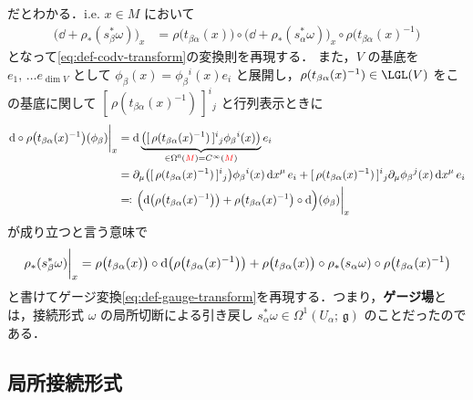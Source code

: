 \documentclass[TQFT_main]{subfiles}
\begin{document}
だとわかる．i.e. $x \in M$ において
\begin{align}
    \bigl(\dd + \rho_* (s^*_\beta \omega)\bigr)_x &= \rho \bigl( t_{\beta\alpha}(x) \bigr) \circ \bigl( \dd + \rho_* (s^*_\alpha \omega) \bigr)_x \circ \rho\bigl(t_{\beta\alpha}(x)^{-1}\bigr)
\end{align}
となって\eqref{eq:def-codv-transform}の変換則を再現する．
また，$V$ の基底を $e_1,\, \dots e_{\dim V}$ として $\phi_\beta(x) = \phi_\beta{}^i (x) e_i$ と展開し，$\rho (t_{\beta\alpha}(x)^{-1}) \in \LGL (V)$ をこの基底に関して $[\, \rho (t_{\beta\alpha}(x)^{-1})\, ]^{i}{}_j$ と行列表示ときに
\begin{align}
    \eval{\dd \circ \rho \bigl( t_{\beta\alpha}(x)^{-1} \bigr) (\phi_\beta)}_x 
    &= \dd\underbrace{\bigl([\, \rho (t_{\beta\alpha}(x)^{-1})\, ]^{i}{}_j \phi_\beta{}^i (x) \bigr)}_{\in \Omega^0(\textcolor{red}{M}) = C^\infty(\textcolor{red}{M})} e_i \\
    &= \partial_\mu \bigl([\, \rho (t_{\beta\alpha}(x)^{-1})\, ]^{i}{}_j \bigr) \phi_{\beta}{}^i (x) \dd{x}^\mu e_i + [\, \rho (t_{\beta\alpha}(x)^{-1})\, ]^{i}{}_j \partial_{\mu} \phi_\beta{}^j (x) \dd{x}^\mu e_i \\
    &\eqqcolon \eval{\Bigl(\dd \bigl(\rho \bigl( t_{\beta\alpha}(x)^{-1} \bigr) \bigr) + \rho \bigl( t_{\beta\alpha}(x)^{-1} \bigr) \circ \dd\Bigr) (\phi_\beta)}_x
\end{align}
が成り立つと言う意味で
\begin{align}
    \eval{\rho_* (s_\beta^* \omega)}_x = \rho \bigl( t_{\beta\alpha}(x) \bigr) \circ \dd \bigl(\rho \bigl( t_{\beta\alpha}(x)^{-1} \bigr)\bigr) + \rho \bigl( t_{\beta\alpha}(x) \bigr) \circ \rho_* (s_\alpha \omega) \circ \rho \bigl( t_{\beta\alpha}(x)^{-1} \bigr)
\end{align}
と書けてゲージ変換\eqref{eq:def-gauge-transform}を再現する．つまり，\textbf{ゲージ場}とは，接続形式 $\omega$ の局所切断による引き戻し $s_\alpha^* \omega \in \Omega^1(U_\alpha;\, \mathfrak{g})$ のことだったのである．

\subsection{局所接続形式}
\end{document}
